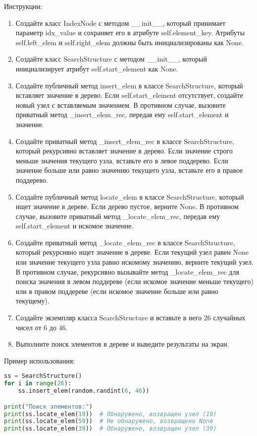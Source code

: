\begin{enumerate}
Инструкции:
\begin{enumerate}
    \item Создайте класс IndexNode с методом \_\_init\_\_, который принимает параметр idx\_value и сохраняет его в атрибуте self.element\_key. Атрибуты self.left\_elem и self.right\_elem должны быть инициализированы как None.
    \item Создайте класс SearchStructure с методом \_\_init\_\_, который инициализирует атрибут self.start\_element как None.
    \item Создайте публичный метод insert\_elem в классе SearchStructure, который вставляет значение в дерево. Если self.start\_element отсутствует, создайте новый узел с вставляемым значением. В противном случае, вызовите приватный метод \_insert\_elem\_rec, передав ему self.start\_element и значение.
    \item Создайте приватный метод \_insert\_elem\_rec в классе SearchStructure, который рекурсивно вставляет значение в дерево. Если значение строго меньше значения текущего узла, вставьте его в левое поддерево. Если значение больше или равно значению текущего узла, вставьте его в правое поддерево.
    \item Создайте публичный метод locate\_elem в классе SearchStructure, который ищет значение в дереве. Если дерево пустое, верните None. В противном случае, вызовите приватный метод \_locate\_elem\_rec, передав ему self.start\_element и искомое значение.
    \item Создайте приватный метод \_locate\_elem\_rec в классе SearchStructure, который рекурсивно ищет значение в дереве. Если текущий узел равен None или значение текущего узла равно искомому значению, верните текущий узел. В противном случае, рекурсивно вызывайте метод \_locate\_elem\_rec для поиска значения в левом поддереве (если искомое значение меньше текущего) или в правом поддереве (если искомое значение больше или равно текущему).
    \item Создайте экземпляр класса SearchStructure и вставьте в него 26 случайных чисел от 6 до 46.
    \item Выполните поиск элементов в дереве и выведите результаты на экран.
\end{enumerate}

Пример использования:
\begin{lstlisting}[language=Python]
ss = SearchStructure()
for i in range(26):
    ss.insert_elem(random.randint(6, 46))

print("Поиск элементов:")
print(ss.locate_elem(19))  # Обнаружено, возвращен узел (19)
print(ss.locate_elem(59))  # Не обнаружено, возвращено None
print(ss.locate_elem(39))  # Обнаружено, возвращен узел (39)
\end{lstlisting}


\end{enumerate}

